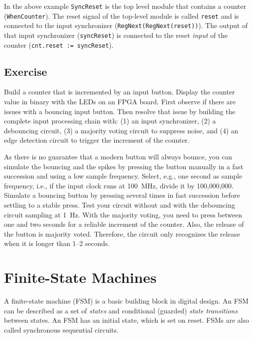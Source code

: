 \documentclass[%
    10pt,
    headinclude, footexclude,
    openright, %
    notitlepage,
    cleardoubleempty,
    headsepline,
    pointlessnumbers,
    bibtotoc, idxtotoc,
    ]{scrbook}
\newcommand{\code}[1]{{\small{\texttt{#1}}}}
\begin{document}

In the above example \code{SyncReset} is the top level module that contains a
counter (\code{WhenCounter}). The reset signal of the top-level module is called
\code{reset} and is connected to the input synchronizer (\code{RegNext(RegNext(reset))}).
The output of that input synchronizer (\code{syncReset}) is connected to the reset \emph{input}
of the counter (\code{cnt.reset := syncReset}).


\section{Exercise}

Build a counter that is incremented by an input button.
Display the counter value in binary with the LEDs on an FPGA board.
First observe if there are issues with a bouncing input button.
Then resolve that issue by building
the complete input processing chain with: (1) an input synchronizer,
(2) a debouncing circuit, (3) a majority voting circuit to suppress noise,
and (4) an edge detection circuit to trigger the increment of the counter.

As there is no guarantee that a modern button will always bounce, you can
simulate the bouncing and the spikes by pressing the button manually in a fast succession
and using a low sample frequency. Select, e.g., one second as sample frequency,
i.e., if the input clock runs at 100~MHz, divide it by 100,000,000.
Simulate a bouncing button by pressing several times in fast succession
before settling to a stable press. Test your circuit without and with the
debouncing circuit sampling at 1~Hz.
With the majority voting, you need to press between one and two seconds
for a reliable increment of the counter. Also, the release of the button is
majority voted. Therefore, the circuit only recognizes the release when it is
longer than 1--2 seconds.

\chapter{Finite-State Machines}

A finite-state machine (FSM) is a basic building block in digital design.
An FSM can be described as a set of \emph{states} and conditional (guarded)
\emph{state transitions} between states.
An FSM has an initial state, which is set on reset.
FSMs are also called synchronous sequential circuits.
\end{document}
